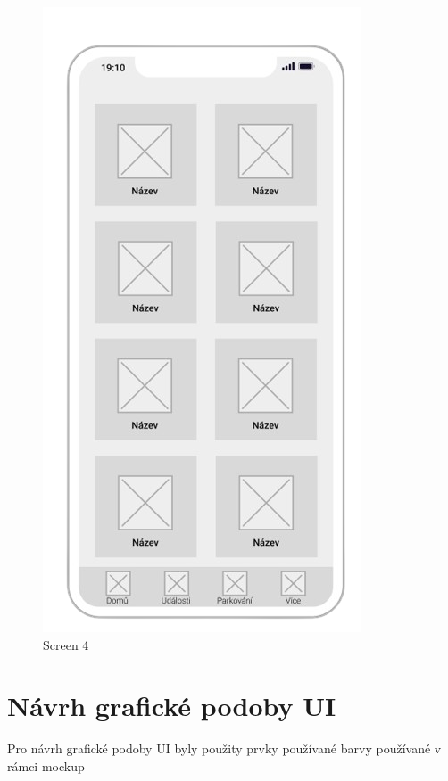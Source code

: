 \begin{figure}[H]
    \includegraphics[width=\linewidth]{more_wireframe.png}
    \caption{Screen 4}\label{fig:screen4}
  \endminipage\hfill
\end{figure}

\section{Návrh grafické podoby UI}
Pro návrh grafické podoby UI byly použity prvky používané  barvy používané v rámci 
mockup

